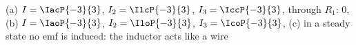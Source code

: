 (a) $I = \IacP{-3}{3}$, $I_2 = \IlcP{-3}{3}$, $I_3 = \IccP{-3}{3}$, through $R_1$: 0, (b) $I = \IaoP{-3}{3}$, $I_2 = \IloP{-3}{3}$, $I_3 = \IcoP{-3}{3}$, (c) in a steady state no emf is induced: the inductor acts like a wire
